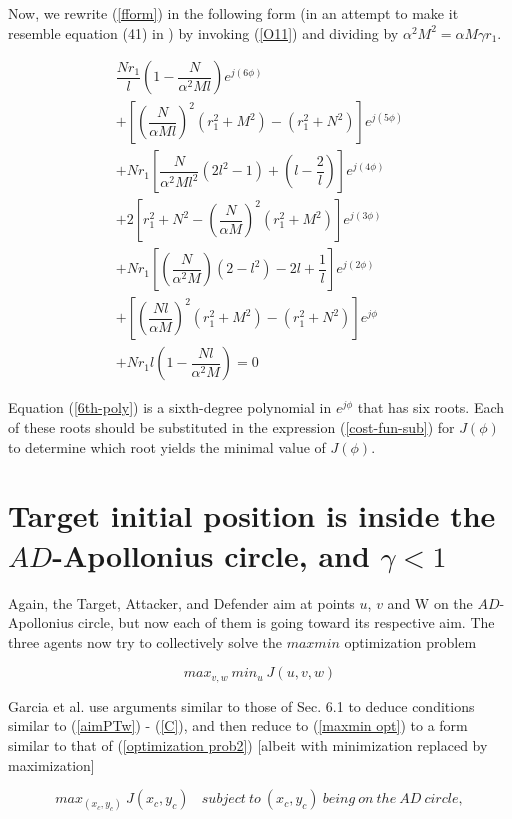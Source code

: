 Now, we rewrite (\ref{fform}) in the following form (in an attempt to make it resemble equation (41) in \cite{garcia2015active}) by invoking (\ref{O11}) and dividing by $\alpha^2 M^2 = \alpha M \gamma r_1$.


\begin{equation}
\begin{split}
\dfrac{Nr_1}{l}(1-\dfrac{N}{\alpha^2 M l}) e^{j(6\phi)}\\
+[(\dfrac{N}{\alpha M l})^2 (r_1^2 + M^2)-(r_1^2 + N^2)]e^{j(5\phi)}\\
+Nr_1 [\dfrac{N}{\alpha^2 M l^2}(2l^2 -1)+(l-\dfrac{2}{l})] e^{j(4\phi)}\\
+2[r_1^2 + N^2 - (\dfrac{N}{\alpha M})^2 (r_1^2 + M^2)]e^{j(3\phi)}\\
+ N r_1 [(\dfrac{N}{\alpha^2 M})(2-l^2)-2l+\dfrac{1}{l}]e^{j(2\phi)}\\
+[(\dfrac{Nl}{\alpha M})^2 (r_1^2 + M^2) - (r_1^2 + N^2)]e^{j \phi}\\
+ Nr_1 l (1- \dfrac{Nl}{\alpha^2 M}) =0
\end{split}
\label{6th-poly}
\end{equation}

Equation (\ref{6th-poly}) is a sixth-degree polynomial in $e^{j\phi}$ that has six roots.
Each of these roots should be substituted in the expression (\ref{cost-fun-sub}) for $J(\phi)$ to determine which root yields the minimal value of $J(\phi)$. 
  

\section{Target initial position is inside the $AD$-Apollonius circle, and $\gamma<1$}
Again, the Target, Attacker, and Defender aim at points $u$, $v$ and W on the $AD$-Apollonius circle, but now each of them is going toward its respective aim. The three agents now try to collectively solve the $maxmin$ optimization problem 

\begin{equation}
max_{v,w}\ min_{u}\ J(u,v,w)
\label{maxmin opt}
\end{equation}

Garcia et al. \cite{garcia2015active} use arguments similar to those of Sec. 6.1 to deduce conditions similar to (\ref{aimPTw}) - (\ref{C}), and then reduce to (\ref{maxmin opt}) to a form similar to that of (\ref{optimization prob2}) [albeit with minimization replaced by maximization]

\begin{equation}
max_{(x_c,y_c)}\ J(x_c, y_c)\ \ \ \ subject\ to\ (x_c,y_c)\ being\ on\ the\ AD\ circle,
\label{constrained optimization}
\end{equation}

